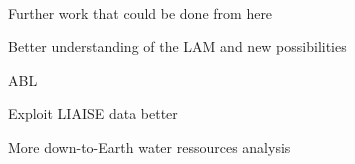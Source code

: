 \hfill\\
Further work that could be done from here

Better understanding of the LAM and new possibilities

ABL

Exploit LIAISE data better

More down-to-Earth water ressources analysis

